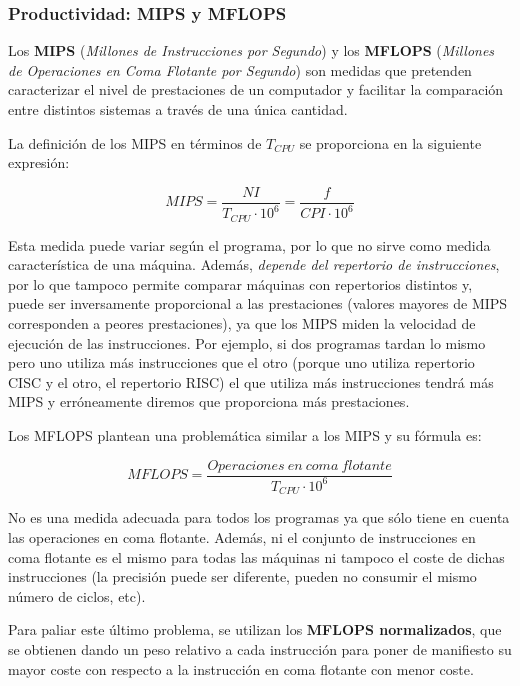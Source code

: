 \documentclass[10pt,a4paper,spanish]{report}
\begin{document}
\textcolor[rgb]{0.2,0.4,0.8}{\subsubsection{Productividad: MIPS y MFLOPS}}
Los \textbf{\textcolor[rgb]{0.2,0.4,0.8}{MIPS}} (\textit{\textcolor[rgb]{0.2,0.4,0.8}{Millones de Instrucciones por Segundo}}) y los \textbf{\textcolor[rgb]{0.2,0.4,0.8}{MFLOPS}} (\textit{\textcolor[rgb]{0.2,0.4,0.8}{Millones de Operaciones en Coma Flotante por Segundo}}) son medidas que pretenden caracterizar el nivel de prestaciones de un computador y facilitar la comparación entre distintos sistemas a través de una única cantidad.

La definición de los MIPS en términos de $T_{CPU}$ se proporciona en la siguiente expresión:

\begin{equation}
  \label{eq:sexta}
  MIPS = \frac{NI}{T_{CPU} \cdot 10^6} = \frac{f}{CPI \cdot 10^6}
\end{equation}

Esta medida puede variar según el programa, por lo que no sirve como medida característica de una máquina. Además, \textit{\textcolor[rgb]{0.2,0.4,0.8}{depende del repertorio de instrucciones}}, por lo que tampoco permite comparar máquinas con repertorios distintos y, puede ser inversamente proporcional a las prestaciones (valores mayores de MIPS corresponden a peores prestaciones), ya que los MIPS miden la velocidad de ejecución de las instrucciones. Por ejemplo, si dos programas tardan lo mismo pero uno utiliza más instrucciones que el otro (porque uno utiliza repertorio CISC y el otro, el repertorio RISC) el que utiliza más instrucciones tendrá más MIPS y erróneamente diremos que proporciona más prestaciones.

Los MFLOPS plantean una problemática similar a los MIPS y su fórmula es:

\begin{equation}
  \label{eq:septima}
  MFLOPS = \frac{Operaciones~en~coma~flotante}{T_{CPU} \cdot 10^6}
\end{equation}

No es una medida adecuada para todos los programas ya que sólo tiene en cuenta las operaciones en coma flotante. Además, ni el conjunto de instrucciones en coma flotante es el mismo para todas las máquinas ni tampoco el coste de dichas instrucciones (la precisión puede ser diferente, pueden no consumir el mismo número de ciclos, etc).

Para paliar este último problema, se utilizan los \textbf{\textcolor[rgb]{0.2,0.4,0.8}{MFLOPS normalizados}}, que se obtienen dando un peso relativo a cada instrucción para poner de manifiesto su mayor coste con respecto a la instrucción en coma flotante con menor coste.
\end{document}
